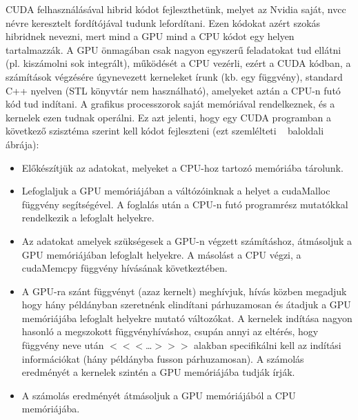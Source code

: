 \documentclass[11pt,a4paper]{article}
\numberwithin{equation}{subsection}
\numberwithin{figure}{section}
\begin{document}
CUDA felhasználásával hibrid kódot fejleszthetünk, melyet az Nvidia saját, nvcc névre keresztelt fordítójával tudunk lefordítani. Ezen kódokat azért szokás hibridnek nevezni, mert mind a GPU mind a CPU kódot egy helyen tartalmazzák. A GPU önmagában csak nagyon egyszerű feladatokat tud ellátni (pl. kiszámolni sok integrált), működését a CPU vezérli, ezért a CUDA kódban, a számítások végzésére úgynevezett kerneleket írunk (kb. egy függvény), standard C++ nyelven (STL könyvtár nem használható), amelyeket aztán a CPU-n futó kód tud indítani. A grafikus processzorok saját memóriával rendelkeznek, és a kernelek ezen tudnak operálni. Ez azt jelenti, hogy egy CUDA programban a következő szisztéma szerint kell kódot fejleszteni (ezt szemlélteti ~ baloldali ábrája):  
\begin{itemize}
\item Előkészítjük az adatokat, melyeket a CPU-hoz tartozó memóriába tárolunk.
\item Lefoglaljuk a GPU memóriájában a váltózóinknak a helyet a cudaMalloc függvény segítségével. A foglalás után a CPU-n futó programrész mutatókkal rendelkezik a lefoglalt helyekre.
\item Az adatokat amelyek szükségesek a GPU-n végzett számításhoz, átmásoljuk a GPU memóriájában lefoglalt helyekre. A másolást a CPU végzi, a cudaMemcpy függvény hívásának következtében.
\item A GPU-ra szánt függvényt (azaz kernelt) meghívjuk, hívás közben megadjuk hogy hány példányban szeretnénk elindítani párhuzamosan és átadjuk a GPU memóriájába lefoglalt helyekre mutató változókat. A kernelek indítása nagyon hasonló a megszokott függvényhíváshoz, csupán annyi az eltérés, hogy függvény neve után \(<\!\!<\!\!<\)\dots\(>\!\!>\!\!>\) alakban specifikálni kell az indítási információkat (hány példányba fusson párhuzamosan). A számolás eredményét a kernelek szintén a GPU memóriájába tudják írják.
\item A számolás eredményét átmásoljuk a GPU memóriájából a CPU memóriájába.
\end{itemize}  
\end{document}

